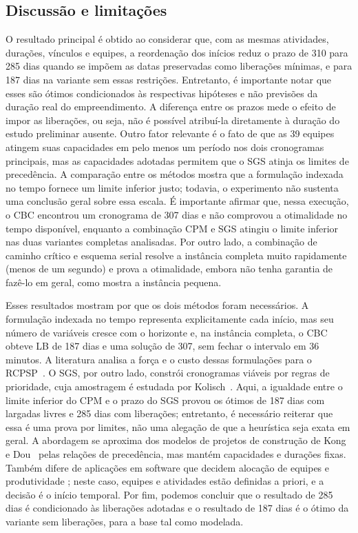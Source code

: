 \subsection{Discussão e limitações}
\label{sec:discussao}

O resultado principal é obtido ao considerar que, com as mesmas atividades, durações, vínculos
e equipes, a reordenação dos inícios reduz o prazo de 310 para 285 dias
quando se impõem as datas preservadas como liberações mínimas, e para 187
dias na variante sem essas restrições. Entretanto, é importante notar que esses são ótimos condicionados às
respectivas hipóteses e não previsões da duração real do empreendimento.
A diferença entre os prazos mede o efeito de impor as liberações, ou seja, não é possível atribuí-la diretamente à duração do estudo preliminar ausente. Outro fator relevante é o fato de que as 39 equipes atingem suas capacidades em pelo menos um período nos dois
cronogramas principais, mas as capacidades adotadas permitem que o SGS
atinja os limites de precedência. A comparação entre os métodos mostra que a formulação indexada no tempo fornece um limite inferior justo; todavia, o experimento não sustenta uma conclusão geral sobre essa escala. É importante afirmar que, nessa execução, o CBC encontrou um cronograma de 307 dias e não comprovou a otimalidade no tempo disponível, enquanto a combinação CPM e SGS atingiu o limite inferior nas duas variantes completas analisadas. Por outro lado, a combinação de caminho crítico
e esquema serial resolve a instância completa muito rapidamente (menos de um segundo) e
prova a otimalidade, embora não tenha garantia de fazê-lo em geral, como
mostra a instância pequena.

Esses resultados mostram por que os dois métodos foram necessários. A
formulação indexada no tempo representa explicitamente cada início, mas
seu número de variáveis cresce com o horizonte e, na instância completa, o
CBC obteve LB de 187 dias e uma solução de 307, sem fechar o intervalo em
36 minutos. A literatura analisa a força e o custo dessas formulações
para o RCPSP~\cite{artigues2017}. O SGS, por outro lado, constrói
cronogramas viáveis por regras de prioridade, cuja amostragem é estudada
por Kolisch~\cite{kolisch1996}. Aqui, a igualdade entre o limite inferior
do CPM e o prazo do SGS provou os ótimos de 187 dias com largadas livres e
285 dias com liberações; entretanto, é necessário reiterar que essa é uma prova por limites, não uma alegação de
que a heurística seja exata em geral. A abordagem se aproxima dos modelos
de projetos de construção de Kong e Dou~\cite{kongdou2020} pelas relações
de precedência, mas mantém capacidades e durações fixas. Também difere de
aplicações em software que decidem alocação de equipes e produtividade
\cite{colares2010}; neste caso, equipes e atividades estão
definidas a priori, e a decisão é o início temporal. Por fim, podemos concluir que o resultado de 285 dias é
condicionado às liberações adotadas e o resultado de 187 dias é o ótimo da variante sem
liberações, para a base tal como modelada.

